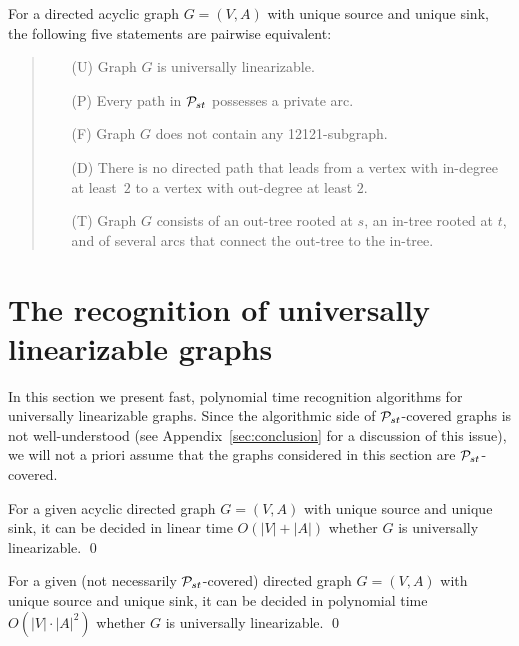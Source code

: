 \documentclass[runningheads]{llncs}
\begin{document}
\begin{theorem}
\label{th:acyclic}
For a directed acyclic graph $G=(V,A)$ with unique source and unique sink, 
the following five statements are pairwise equivalent:
\begin{quote}
\begin{itemize}
\itemsep=0.9ex
\item[(U)] Graph $G$ is universally linearizable.
\item[(P)] Every path in ${\cal P}_{st}$ possesses a private arc.
\item[(F)] Graph $G$ does not contain any 12121-subgraph.
\item[(D)] There is no directed path that leads from a vertex with in-degree 
at least~$2$ to a vertex with out-degree at least $2$.
\item[(T)] Graph $G$ consists of an out-tree rooted at $s$, an in-tree rooted at $t$,
and of several arcs that connect the out-tree to the in-tree.
\end{itemize}
\end{quote}
\end{theorem}


\section{The recognition of universally linearizable graphs}
\label{sec:algo}
In this section we present fast, polynomial time recognition algorithms for
universally linearizable graphs.
Since the algorithmic side of ${\cal P}_{st}$-covered graphs is not well-understood 
(see Appendix~\ref{sec:conclusion} for a discussion of this issue), we will not a priori 
assume that the graphs considered in this section are ${\cal P}_{st}$-covered.

\begin{lemma}
\label{le:algo-acyclic}
For a given acyclic directed graph $G=(V,A)$ with unique source and unique sink, 
it can be decided in linear time $O(|V|+|A|)$ whether $G$ is universally linearizable.
\qed
\end{lemma}

\begin{theorem}
\label{th:algo}
For a given (not necessarily ${\cal P}_{st}$-covered) directed graph $G=(V,A)$ with unique source and 
unique sink, it can be decided in polynomial time $O(|V|\cdot|A|^2)$ 
whether $G$ is universally linearizable.
\qed
\end{theorem}
\end{document}
